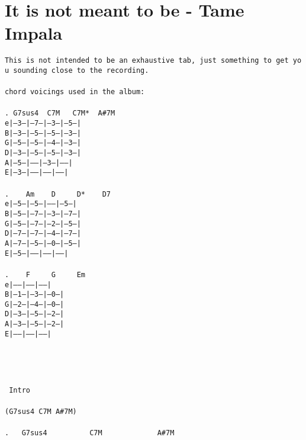 \newpage
\section{It is not meant to be - Tame Impala}
\label{It is not meant to be - Tame Impala}
\texttt{This\ is\ not\ intended\ to\ be\ an\ exhaustive\ tab,\ just\ something\ to\ get\ you\ sounding\ close\ to\ the\ recording.\\
\\
chord\ voicings\ used\ in\ the\ album:\\
\\
. G7sus4\ \ C7M\ \ \ C7M*\ \ A\#7M\\
e|--3--|--7--|--3--|--5--|\\
B|--3--|--5--|--5--|--3--|\\
G|--5--|--5--|--4--|--3--|\\
D|--3--|--5--|--5--|--3--|\\
A|--5--|-----|--3--|-----|\\
E|--3--|-----|-----|-----|\\
\\
. \ \ \ Am\ \ \ \ D\ \ \ \ \ D*\ \ \ \ D7\\
e|--5--|--5--|-----|--5--|\\
B|--5--|--7--|--3--|--7--|\\
G|--5--|--7--|--2--|--5--|\\
D|--7--|--7--|--4--|--7--|\\
A|--7--|--5--|--0--|--5--|\\
E|--5--|-----|-----|-----|\\
\\
. \ \ \ F\ \ \ \ \ G\ \ \ \ \ Em\\
e|-----|-----|-----|\\
B|--1--|--3--|--0--|\\
G|--2--|--4--|--0--|\\
D|--3--|--5--|--2--|\\
A|--3--|--5--|--2--|\\
E|-----|-----|-----|\\
\\
\\
\\
\\
\lbrack\ Intro\rbrack\\
\\
(G7sus4\ C7M\ A\#7M)\\
\\
. \ \ G7sus4\ \ \ \ \ \ \ \ \ \ C7M\ \ \ \ \ \ \ \ \ \ \ \ \ A\#7M\\
}
